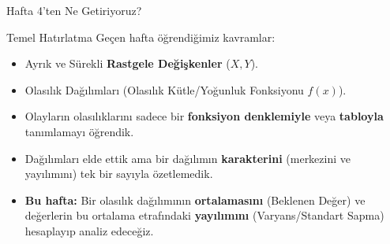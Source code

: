 \documentclass[light]{lutbeamer}
\begin{document}
\begin{frame}{Hafta 4'ten Ne Getiriyoruz?}
    \begin{block}{Temel Hatırlatma}
        Geçen hafta öğrendiğimiz kavramlar:
        \begin{itemize}
            \item Ayrık ve Sürekli \textbf{Rastgele Değişkenler} ($X, Y$).
            \item Olasılık Dağılımları (Olasılık Kütle/Yoğunluk Fonksiyonu $f(x)$).
            \item Olayların olasılıklarını sadece bir \textbf{fonksiyon denklemiyle} veya \textbf{tabloyla} tanımlamayı öğrendik.
        \end{itemize}
    \end{block}

    \begin{itemize}
        \item Dağılımları elde ettik ama bir dağılımın \textbf{karakterini} (merkezini ve yayılımını) tek bir sayıyla özetlemedik.
        \item \textbf{Bu hafta:} Bir olasılık dağılımının \textbf{ortalamasını} (Beklenen Değer) ve değerlerin bu ortalama etrafındaki \textbf{yayılımını} (Varyans/Standart Sapma) hesaplayıp analiz edeceğiz.
    \end{itemize}
\end{frame}
\end{document}
